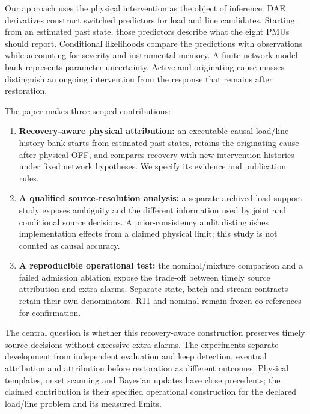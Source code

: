 Our approach uses the physical intervention as the object of inference.
DAE derivatives construct switched predictors for load and line candidates.
Starting from an estimated past state, those predictors describe what the
eight PMUs should report. Conditional likelihoods compare the predictions
with observations while accounting for severity and instrumental memory.
A finite network-model bank represents parameter uncertainty. Active and
originating-cause masses distinguish an ongoing intervention from the
response that remains after restoration.

The paper makes three scoped contributions:
\begin{enumerate}
\item \textbf{Recovery-aware physical attribution:} an executable causal load/line history bank starts from estimated past states, retains the originating cause after physical OFF, and compares recovery with new-intervention histories under fixed network hypotheses. We specify its evidence and publication rules.
\item \textbf{A qualified source-resolution analysis:} a separate archived load-support study exposes ambiguity and the different information used by joint and conditional source decisions. A prior-consistency audit distinguishes implementation effects from a claimed physical limit; this study is not counted as causal accuracy.
\item \textbf{A reproducible operational test:} the nominal/mixture comparison and a failed admission ablation expose the trade-off between timely source attribution and extra alarms. Separate state, batch and stream contracts retain their own denominators. R11 and nominal remain frozen co-references for confirmation.
\end{enumerate}

The central question is whether this recovery-aware construction preserves
timely source decisions without excessive extra alarms. The experiments
separate development from independent evaluation and keep detection,
eventual attribution and attribution before restoration as different
outcomes. Physical templates, onset scanning and Bayesian updates have
close precedents; the claimed contribution is their specified operational
construction for the declared load/line problem and its measured limits.


